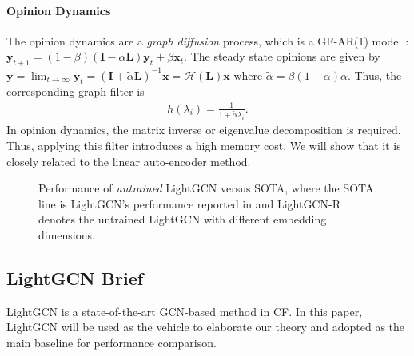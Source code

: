 \documentclass[sigconf]{acmart}
\begin{document}
\paragraph{Opinion Dynamics} The opinion dynamics are a \emph{graph diffusion} process, which is a GF-AR(1) model \cite{friedkin2011formal}: $\bm{y}_{t+1} = (1 - \beta) (\bm{I} - \alpha \bm{L}) \bm{y}_t + \beta \bm{x}_t$. The steady state opinions are given by $\bm{y} = \lim_{t \rightarrow \infty} \bm{y}_t  = (\bm{I} + \tilde{\alpha} \bm{L})^{-1} \bm{x} = \mathcal{H}(\bm{L}) \bm{x}$ where $\tilde{\alpha} = \beta (1 - \alpha) \alpha$. Thus, the corresponding graph filter is
\begin{align} \label{fil:opi}
    h(\lambda_i) = \frac{1}{1 + \tilde{\alpha} \lambda_i}.
\end{align}
In opinion dynamics, the matrix inverse or eigenvalue decomposition is required. Thus, applying this filter introduces a high memory cost. We will show that it is closely related to the linear auto-encoder method.
\begin{figure*}[htbp]
    \centering
        \caption{
        Performance of \emph{untrained} LightGCN versus SOTA, where the SOTA line is LightGCN's performance reported in \cite{he2020lightgcn} and LightGCN-R denotes the untrained LightGCN with different embedding dimensions. }
    \label{fig:untrained}
\end{figure*}


\subsection{LightGCN Brief} \label{sec:lightgcn}
LightGCN \cite{he2020lightgcn} is a state-of-the-art GCN-based method in CF. In this paper, LightGCN will be used as the vehicle to elaborate our theory and adopted as the main baseline for performance comparison. 
\end{document}
